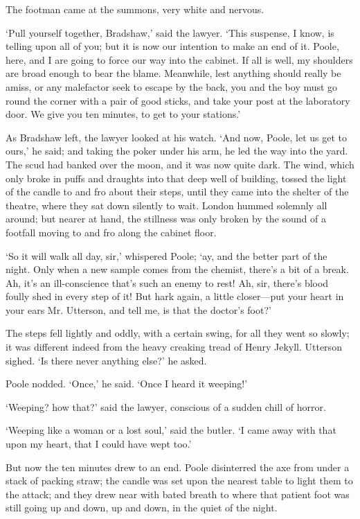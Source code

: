 \documentclass[]{novel}
\begin{document}
The footman came at the summons, very white and nervous.\-

‘Pull yourself together, Bradshaw,’ said the lawyer. ‘This suspense, I know, is telling upon all of you; but it is now our intention to make an end of it. Poole, here, and I are going to force our way into the cabinet. If all is well, my shoulders are broad enough to bear the blame. Meanwhile, lest anything should really be amiss, or any malefactor seek to escape by the back, you and the boy must go round the corner with a pair of good sticks, and take your post at the laboratory door. We give you ten minutes, to get to your stations.’

As Bradshaw left, the lawyer looked at his watch. ‘And now, Poole, let us get to ours,’ he said; and taking the poker under his arm, he led the way into the yard. The scud had banked over the moon, and it was now quite dark. The wind, which only broke in puffs and draughts into that deep well of building, tossed the light of the candle to and fro about their steps, until they came into the shelter of the theatre, where they sat down silently to wait. London hummed solemnly all around; but nearer at hand, the stillness was only broken by the sound of a footfall moving to and fro along the cabinet floor.

‘So it will walk all day, sir,’ whispered Poole; ‘ay, and the better part of the night. Only when a new sample comes from the chemist, there’s a bit of a break. Ah, it’s an ill-conscience that’s such an enemy to rest! Ah, sir, there’s blood foully shed in every step of it! But hark again, a little closer—put your heart in your ears Mr. Utterson, and tell me, is that the doctor’s foot?’

The steps fell lightly and oddly, with a certain swing, for all they went so slowly; it was different indeed from the heavy creaking tread of Henry Jekyll. Utterson sighed. ‘Is there never anything else?’ he asked.

Poole nodded. ‘Once,’ he said. ‘Once I heard it weeping!’

‘Weeping? how that?’ said the lawyer, conscious of a sudden chill of horror.

‘Weeping like a woman or a lost soul,’ said the butler. ‘I came away with that upon my heart, that I could have wept too.’

But now the ten minutes drew to an end. Poole disinterred the axe from under a stack of packing straw; the candle was set upon the nearest table to light them to the attack; and they drew near with bated breath to where that patient foot was still going up and down, up and down, in the quiet of the night.
\end{document}
